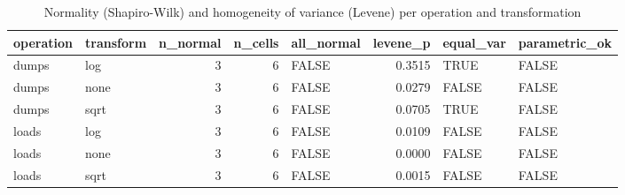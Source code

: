 \begin{table}[ht]
\centering
\begin{tabular}{llrrlrll}
  \toprule
operation & transform & n\_normal & n\_cells & all\_normal & levene\_p & equal\_var & parametric\_ok \\ 
  \midrule
dumps & log &     3 &     6 & FALSE & 0.3515 & TRUE & FALSE \\ 
  dumps & none &     3 &     6 & FALSE & 0.0279 & FALSE & FALSE \\ 
  dumps & sqrt &     3 &     6 & FALSE & 0.0705 & TRUE & FALSE \\ 
  loads & log &     3 &     6 & FALSE & 0.0109 & FALSE & FALSE \\ 
  loads & none &     3 &     6 & FALSE & 0.0000 & FALSE & FALSE \\ 
  loads & sqrt &     3 &     6 & FALSE & 0.0015 & FALSE & FALSE \\ 
   \bottomrule
\end{tabular}
\caption{Normality (Shapiro-Wilk) and homogeneity of variance (Levene) per operation and transformation} 
\label{tab:assumptions_summary}
\end{table}

